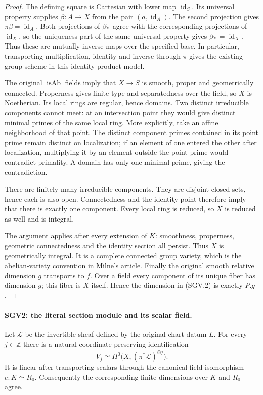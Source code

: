 \documentclass[11pt,a4paper]{article}
\numberwithin{equation}{section}
\theoremstyle{remark}\newtheorem{remark}[theorem]{Remark}
\begin{document}
\begin{proof}
The defining square is Cartesian with lower map
$\operatorname{id}_S$.  Its universal property supplies
$\beta:A\to X$ from the pair $(a,\operatorname{id}_A)$.
The second projection gives $\pi\beta=\operatorname{id}_A$.
Both projections of $\beta\pi$ agree with the corresponding
projections of $\operatorname{id}_X$, so the uniqueness part of the
same universal property gives $\beta\pi=\operatorname{id}_X$.
Thus these are mutually inverse maps over the specified base.  In
particular, transporting multiplication, identity and inverse through
$\pi$ gives the existing group scheme in this identity-product model.

The original $\operatorname{isAb}$ fields imply that $X\to S$ is
smooth, proper and geometrically connected.  Properness gives finite
type and separatedness over the field, so $X$ is Noetherian.  Its local
rings are regular, hence domains.  Two distinct irreducible components
cannot meet: at an intersection point they would give distinct
minimal primes of the same local ring.  More explicitly, take an
affine neighborhood of that point.  The distinct component primes
contained in its point prime remain distinct on localization; if an
element of one entered the other after localization, multiplying it
by an element outside the point prime would contradict primality.
A domain has only one minimal prime, giving the contradiction.

There are finitely many irreducible components.  They are disjoint
closed sets, hence each is also open.  Connectedness and the identity
point therefore imply that there is exactly one component.  Every
local ring is reduced, so $X$ is reduced as well and is integral.

The argument applies after every extension of $K$: smoothness,
properness, geometric connectedness and the identity section all
persist.  Thus $X$ is geometrically integral.  It is a complete
connected group variety, which is the abelian-variety convention in
Milne's article.  Finally the original smooth relative dimension $g$
transports to $f$.  Over a field every component of its unique fiber
has dimension $g$; this fiber is $X$ itself.  Hence the dimension in
(SGV.2) is exactly $P.g$.
\end{proof}

\paragraph{SGV2: the literal section module and its scalar field.}
\label{claim:SGV2}
Let $\mathcal L$ be the invertible sheaf defined by the original
chart datum $L$.  For every $j\in\mathbb Z$ there is a natural
coordinate-preserving identification
\[
 V_j\simeq H^0\bigl(X,(\pi^*\mathcal L)^{\otimes j}\bigr).
                                                        \tag{SGV.3}
\]
It is linear after transporting scalars through the canonical field
isomorphism $e:K\simeq R_0$.  Consequently the corresponding finite
dimensions over $K$ and $R_0$ agree.
\end{document}
